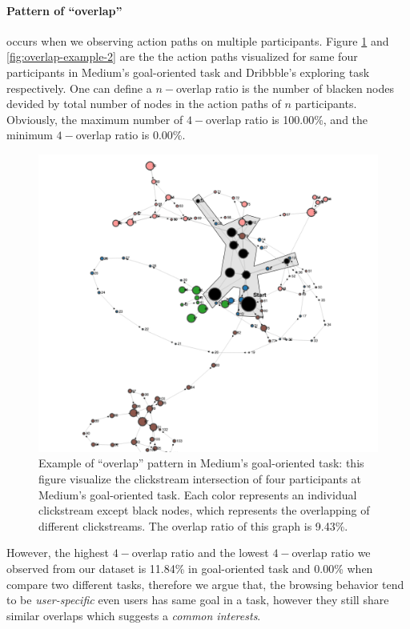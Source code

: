 \paragraph{Pattern of ``overlap''}
occurs when we observing action paths on multiple participants. Figure \ref{fig:overlap-example-1}
and \ref{fig:overlap-example-2} are the the action paths visualized for same four participants
in Medium's goal-oriented task and Dribbble's exploring task respectively.
One can define a $n-$overlap ratio is the number of blacken nodes devided by total number of nodes
in the action paths of $n$ participants. Obviously, the maximum number of $4-$overlap ratio
is 100.00\%, and the minimum $4-$overlap ratio is 0.00\%.

\begin{figure}[H]
    \centering
    \includegraphics[width=1\textwidth]{figures/overlap1}
    \caption{Example of ``overlap'' pattern in Medium's goal-oriented task: 
    this figure visualize the clickstream intersection 
    of four participants at Medium's goal-oriented task. Each color represents an
    individual clickstream except black nodes, which represents the overlapping of different clickstreams.
    The overlap ratio of this graph is 9.43\%.}
    \label{fig:overlap-example-1}
\end{figure}

However, the highest $4-$overlap ratio and the lowest $4-$overlap ratio we observed from our
dataset is 11.84\% in goal-oriented task and 0.00\% when compare two different tasks, 
therefore we argue that, the browsing behavior tend to be \emph{user-specific} even users has same
goal in a task, however they still share similar overlaps which suggests a \emph{common interests}.

